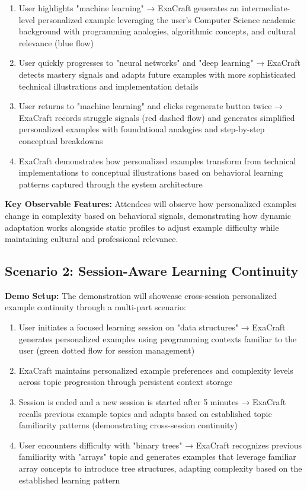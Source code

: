 \documentclass[sigconf]{acmart}
\begin{document}
\begin{enumerate}
    \item User highlights "machine learning" → ExaCraft generates an intermediate-level personalized example leveraging the user's Computer Science academic background with programming analogies, algorithmic concepts, and cultural relevance (blue flow)
    \item User quickly progresses to "neural networks" and "deep learning" → ExaCraft detects mastery signals and adapts future examples with more sophisticated technical illustrations and implementation details
    \item User returns to "machine learning" and clicks regenerate button twice → ExaCraft records struggle signals (red dashed flow) and generates simplified personalized examples with foundational analogies and step-by-step conceptual breakdowns
    \item ExaCraft demonstrates how personalized examples transform from technical implementations to conceptual illustrations based on behavioral learning patterns captured through the system architecture
\end{enumerate}

\textbf{Key Observable Features:} Attendees will observe how personalized examples change in complexity based on behavioral signals, demonstrating how dynamic adaptation works alongside static profiles to adjust example difficulty while maintaining cultural and professional relevance.

\subsection{Scenario 2: Session-Aware Learning Continuity}

\textbf{Demo Setup:} The demonstration will showcase cross-session personalized example continuity through a multi-part scenario:

\begin{enumerate}
    \item User initiates a focused learning session on "data structures" → ExaCraft generates personalized examples using programming contexts familiar to the user (green dotted flow for session management)
    \item ExaCraft maintains personalized example preferences and complexity levels across topic progression through persistent context storage
    \item Session is ended and a new session is started after 5 minutes → ExaCraft recalls previous example topics and adapts based on established topic familiarity patterns (demonstrating cross-session continuity)
    \item User encounters difficulty with "binary trees" → ExaCraft recognizes previous familiarity with "arrays" topic and generates examples that leverage familiar array concepts to introduce tree structures, adapting complexity based on the established learning pattern
\end{enumerate}
\end{document}

